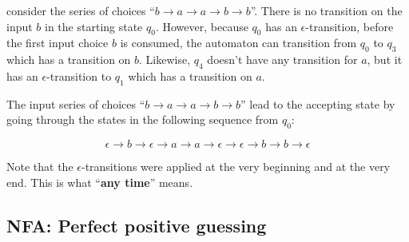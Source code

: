 \documentclass[12pt, letterpaper, oneside]{book}
\begin{document}

consider the series of choices ``$b \rightarrow a \rightarrow a \rightarrow b \rightarrow b$''. There is no transition
on the input $b$ in the starting state $q_0$. However, because $q_0$ has an $\epsilon$-transition, before the first
input choice $b$ is consumed, the automaton can transition from $q_0$ to $q_3$ which has a transition on $b$. Likewise,
$q_4$ doesn't have any transition for $a$, but it has an $\epsilon$-transition to $q_1$ which has a transition on $a$.

The input series of choices ``$b \rightarrow a \rightarrow a \rightarrow b \rightarrow b$'' lead to the accepting state
by going through the states in the following sequence from $q_0$:

\[
  \epsilon \rightarrow b \rightarrow \epsilon \rightarrow a \rightarrow a \rightarrow \epsilon \rightarrow \epsilon
  \rightarrow b \rightarrow b \rightarrow \epsilon
\]

Note that the $\epsilon$-transitions were applied at the very beginning and at the very end. This is what ``\textbf{any
  time}'' means.

\subsection{NFA: Perfect positive guessing} \label{automata:nfa:perfect-positive-guessing}
\end{document}
